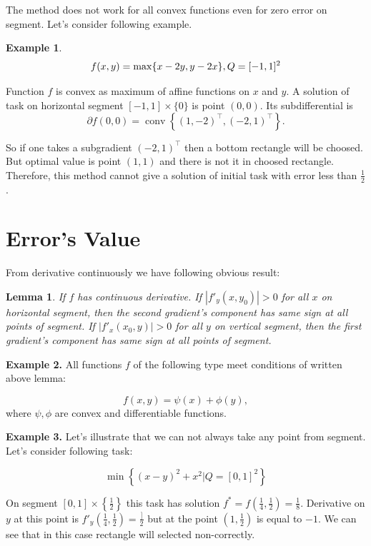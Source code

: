 \documentclass[12pt]{article}
\newtheorem{lemma}{Lemma}[section]
\DeclareMathOperator{\conv}{conv}
\begin{document}
The method does not work for all convex functions even for zero error on segment. Let's consider following example.

\textbf{Example 1}.
\begin{equation}
f(x,y) = \max\{x-2y, y-2x\}, \\
Q = [-1, 1]^2
\end{equation}

Function $f$ is convex as maximum of affine functions on $x$ and $y$. A solution of task on horizontal segment $[-1, 1]\times\{0\}$ is point $(0, 0)$. Its subdifferential is $$\partial f(0,0) = \conv\left\{(1, -2)^\top, (-2,1)^\top\right\}.$$ 

So if one takes a subgradient $(-2, 1)^\top$ then a bottom rectangle will be choosed. But optimal value is point $(1,1)$ and there is not it in choosed rectangle. Therefore, this method cannot give a solution of initial task with error less than $\frac{1}{2}$.

\section{Error's Value}

From derivative continuously we have following obvious result:

\begin{lemma}
If $f$ has continuous derivative. If $|f'_y(x, y_0)| > 0$ for all $x$ on horizontal segment, then the second gradient's component has same sign at all points of segment. If $|f'_x(x_0, y)| > 0$ for all $y$ on vertical segment, then the first gradient's component has same sign at all points of segment.
\end{lemma}

\textbf{Example 2.} All functions $f$ of the following type meet conditions of written above lemma:

$$f(x, y) = \psi(x) + \phi(y),$$
where $\psi, \phi$ are convex and differentiable functions.

\textbf{Example 3.} Let's illustrate that we can not always take any point from segment. Let's consider following task:

$$\min\left\{(x-y)^2 + x^2\Big|Q = [0,1]^2\right\}$$

On segment $[0,1]\times\left\{\frac{1}{2}\right\}$ this task has solution $f^* = f\left(\frac{1}{4}, \frac{1}{2}\right) = \frac{1}{8}$. Derivative on $y$ at this point is $f'_y\left(\frac{1}{4}, \frac{1}{2}\right) = \frac{]}{2}$ but at the point $\left(1, \frac{1}{2}\right)$ is equal to $-1$. We can see that in this case rectangle will selected non-correctly.
\end{document}
